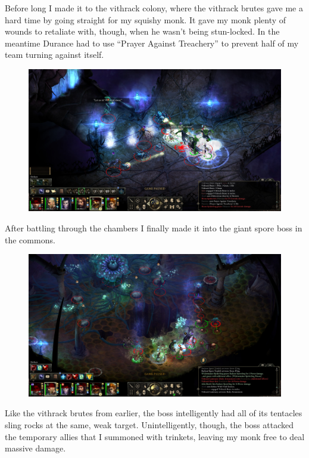 \documentclass{article}
\begin{document}
Before long I made it to the vithrack colony, where the vithrack brutes gave me a hard time by going straight for my squishy monk.  It gave my monk plenty of wounds to retaliate with, though, when he wasn't being stun-locked.  In the meantime Durance had to use ``Prayer Against Treachery'' to prevent half of my team turning against itself.

\begin{figure}
\includegraphics[scale=0.33]{files/blog/2020_01_18_poe_potd_wmpt2/2020_01_18_mines3.jpg}
\end{figure}

After battling through the chambers I finally made it into the giant spore boss in the commons.

\begin{figure}
\includegraphics[scale=0.33]{files/blog/2020_01_18_poe_potd_wmpt2/2020_01_18_mines4.jpg}
\end{figure}

Like the vithrack brutes from earlier, the boss intelligently had all of its tentacles sling rocks at the same, weak target.  Unintelligently, though, the boss attacked the temporary allies that I summoned with trinkets, leaving my monk free to deal massive damage.
\end{document}
